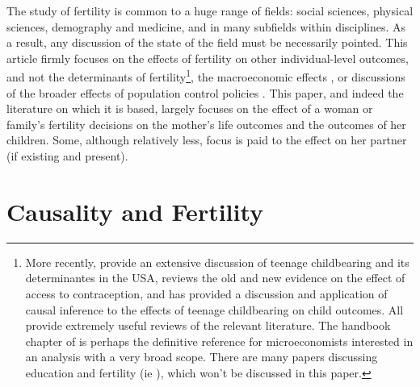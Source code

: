\documentclass{article}
\begin{document}
\begin{spacing}{1.4}
The study of fertility is common to a huge range of fields: social sciences, 
physical sciences, demography and medicine, and in many subfields within 
disciplines.  As a result, any discussion of the state of the field must
be necessarily pointed.  This article firmly focuses on the effects
of fertility on other individual-level outcomes, and not the determinants of
fertility\footnote{More recently, \citet{KearneyLevine2012} provide an extensive 
discussion of teenage childbearing and its determinantes in the USA, 
\citet{Bailey2013} reviews the old and new evidence on the effect of access to 
contraception, and \citet{Moffitt2005} has provided a discussion and application 
of causal inference to the effects of teenage childbearing on child outcomes. All
provide extremely useful reviews of the relevant literature.  The handbook chapter
of \citet{Schultz2008} is perhaps the definitive reference for microeconomists
interested in an analysis with a very broad scope.  There are many papers
discussing education and fertility (ie \citet{Blacketal2008}), which won't be 
discussed in this paper.}, the macroeconomic effects \citep{Enke1966,Enke1971}, 
or discussions of the broader effects of population control policies
\citep{GMiller2009,RosenzweigWolpin1986}.
This paper, and indeed the literature on which it is based, largely focuses on 
the effect of a woman or family's fertility decisions on the mother's life 
outcomes and the outcomes of her children.  Some, although relatively less, 
focus is paid to the effect on her partner (if existing and present). 


\section{Causality and Fertility}
\label{Fscn:causality}

\end{spacing}
\end{document}
